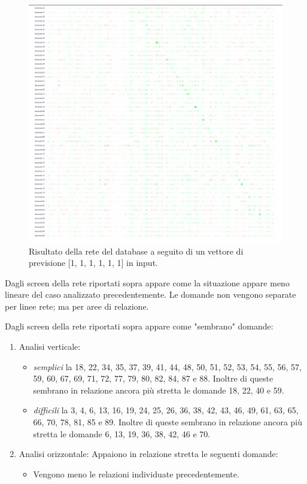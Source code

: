 \begin{itemize}
\begin{figure}[H]
\centering
	\includegraphics[width=0.90\linewidth]{./image/rete_db-vp1_2architettura2.png}
	\caption{Risultato della rete del database a seguito di un vettore di previsione [1, 1, 1, 1, 1, 1] in input.}
	\label{Risultato della rete del database a seguito di un vettore di previsione [1, 1, 1, 1, 1, 1] in input.}
\end{figure}


Dagli screen della rete riportati sopra appare come la situazione appare meno lineare del caso analizzato precedentemente. 
Le domande non vengono separate per linee rete; ma per aree di relazione.


Dagli screen della rete riportati sopra appare come "sembrano" domande:
\begin{enumerate}
\item Analisi verticale:
\begin{itemize}
\item \textit{semplici} la 18, 22, 34, 35, 37, 39, 41, 44, 48, 50, 51, 52, 53, 54, 55, 56, 57, 59, 60, 67, 69,  71, 72, 77, 79, 80, 82, 84, 87 e 88. Inoltre di queste sembrano in relazione ancora pi\`u stretta le domande 18, 22, 40 e 59.
\item \textit{difficili} la 3, 4, 6, 13, 16, 19, 24, 25, 26, 36, 38, 42, 43, 46, 49, 61, 63, 65, 66, 70, 78, 81, 85 e 89. Inoltre di queste sembrano in relazione ancora pi\`u stretta le domande 6, 13, 19, 36, 38, 42, 46 e 70.
\end{itemize}
\item Analisi orizzontale:
Appaiono in relazione stretta le seguenti domande:
\begin{itemize}
\item Vengono meno le relazioni individuate precedentemente.
\end{itemize}
\end{enumerate}
\noindent



\end{itemize}
